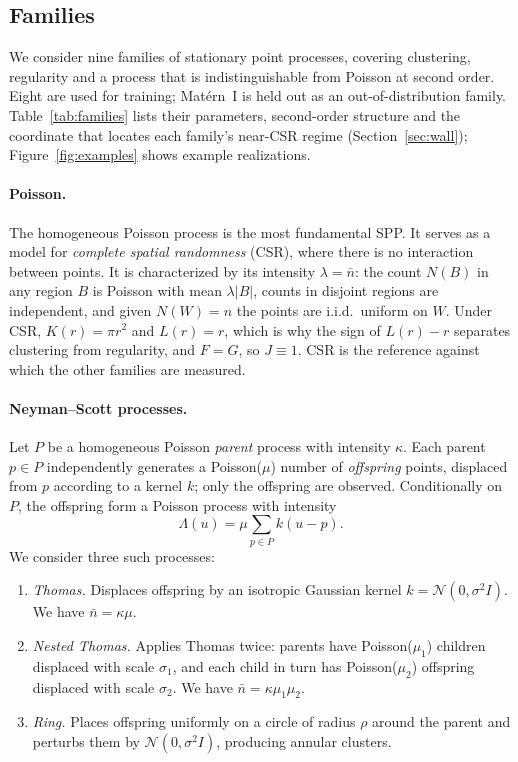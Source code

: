 \documentclass[twoside]{article}
\newcommand{\nb}{\bar n}
\newcommand{\kpar}{\kappa}
\newcommand{\mo}{\mu}
\begin{document}
\subsection{Families}
\label{sec:families}

We consider nine families of stationary point processes, covering clustering, regularity and a process that is
indistinguishable from Poisson at second order. Eight are used for training; Mat\'ern~I is held out as an
out-of-distribution family. Table~\ref{tab:families} lists their parameters, second-order structure and the coordinate that locates each family's near-CSR regime (Section~\ref{sec:wall}); Figure~\ref{fig:examples} shows
example realizations.

\paragraph{Poisson.}
The homogeneous Poisson process is the most fundamental SPP. It serves as a model for \emph{complete spatial
randomness} (CSR), where there is no interaction between points. It is characterized by its intensity $\lambda=\nb$:
the count $N(B)$ in any region $B$ is Poisson with mean $\lambda|B|$, counts in disjoint regions are independent, and
given $N(W)=n$ the points are i.i.d.\ uniform on $W$. Under CSR, $K(r)=\pi r^2$ and $L(r)=r$, which is why the sign of
$L(r)-r$ separates clustering from regularity, and $F=G$, so $J\equiv1$. CSR is the reference against which the other
families are measured.

\paragraph{Neyman--Scott processes.}
Let $P$ be a homogeneous Poisson \emph{parent} process with intensity $\kpar$. Each parent $p\in P$ independently
generates a Poisson($\mo$) number of \emph{offspring} points, displaced from $p$ according to a kernel $k$; only the
offspring are observed. Conditionally on $P$, the offspring form a Poisson process with intensity
\[
  \Lambda(u) = \mo \sum_{p \in P} k(u - p).
\]
We consider three such processes: 
\begin{enumerate}
    \item \emph{Thomas.} Displaces offspring by an isotropic Gaussian kernel $k=\mathcal N(0,\sigma^2 I)$. We have $\nb=\kpar\mo$.
    \item \emph{Nested Thomas.} Applies Thomas twice: parents have Poisson($\mu_1$) children displaced with scale $\sigma_1$, and each child in turn has Poisson($\mu_2$) offspring displaced with scale $\sigma_2$. We have $\nb=\kpar\mu_1\mu_2$.
    \item \emph{Ring.} Places offspring uniformly on a circle of radius $\rho$ around the parent and perturbs them by $\mathcal N(0,\sigma^2 I)$, producing annular clusters. 
\end{enumerate}
\end{document}

